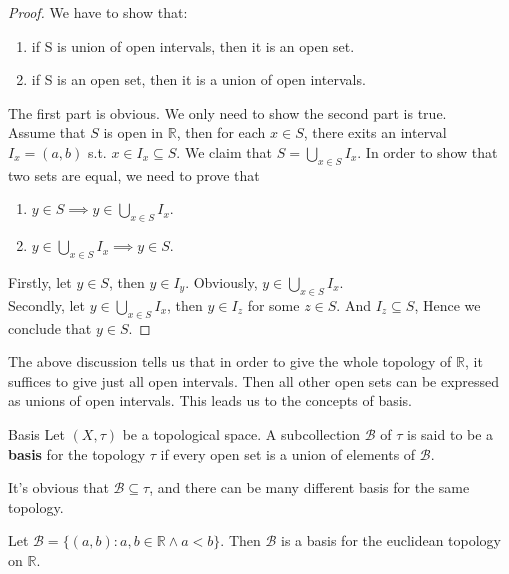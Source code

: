 \begin{proof}
    We have to show that:
    \begin{enumerate}

        \item if S is union of open intervals, then it is an open set.
        \item if S is an open set, then it is a union of open intervals.

    \end{enumerate}
    The first part is obvious. We only need to show the second part is true.\\
    Assume that $S$ is open in $\mathbb{R}$, then for each $x \in S$, there
    exits an interval $I_x = (a,b)$ s.t. $x \in I_x \subseteq S$.
    We claim that $S = \bigcup_{x \in S} I_x$. In order to show that
    two sets are equal, we need to prove that
    \begin{enumerate}

        \item $y \in S \implies y \in \bigcup_{x \in S} I_x$.
        \item $y \in \bigcup_{x \in S} I_x \implies y \in S$.

    \end{enumerate}
    Firstly, let $y \in S$, then $y \in I_y$. Obviously, $y \in
    \bigcup_{x \in S} I_x$.\\
    Secondly, let $y \in \bigcup_{x \in S} I_x$, then $y \in I_z$ for
    some $z \in S$. And $I_z \subseteq S$, Hence we conclude
    that $y \in S$.
\end{proof}

The above discussion tells us that in order to give the whole
topology of $\mathbb{R}$, it suffices to give just all open
intervals. Then all other open sets can be expressed as unions of
open intervals. This leads us to the concepts of basis.

\begin{definition}{Basis}{}
    Let $(X,\tau)$ be a topological space. A subcollection $\mathcal{B}$ of
    $\tau$ is said to be a \textbf{basis} for the
    topology $\tau$ if every open set is a union of elements of $\mathcal{B}$.
\end{definition}

\begin{remarks}
    It's obvious that $\mathcal{B} \subseteq \tau$, and there can be
    many different
    basis for the same topology.
\end{remarks}

\begin{example}
    Let $\mathcal{B} = \{(a,b): a,b \in \mathbb{R} \land a < b\}$.
    Then $\mathcal{B}$ is a basis for the euclidean topology on $\mathbb{R}$.
\end{example}

